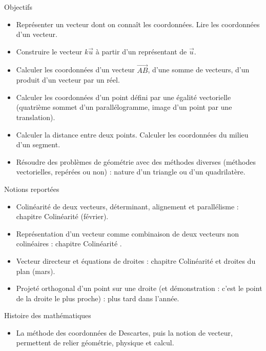 \documentclass{article}
\theoremstyle{definition}
\begin{document}
\begin{paragraph}{Objectifs}
  \begin{itemize}
    \item Représenter un vecteur dont on connaît les coordonnées. Lire les coordonnées d'un vecteur.
    \item Construire le vecteur $k\vec{u}$ à partir d'un représentant de $\vec{u}$.
    \item Calculer les coordonnées d'un vecteur $\overrightarrow{AB}$, d'une somme de vecteurs, d'un produit d'un vecteur par un réel.
    \item Calculer les coordonnées d'un point défini par une égalité vectorielle (quatrième sommet d'un parallélogramme, image d'un point par une translation).
    \item Calculer la distance entre deux points. Calculer les coordonnées du milieu d'un segment.
    \item Résoudre des problèmes de géométrie avec des méthodes diverses (méthodes vectorielles, repérées ou non) : nature d'un triangle ou d'un quadrilatère.
  \end{itemize}
\end{paragraph}

\begin{paragraph}{Notions reportées}
    \begin{itemize}
        \item Colinéarité de deux vecteurs, déterminant, alignement et parallélisme : chapitre \og Colinéarité \fg{} (février).
        \item Représentation d'un vecteur comme combinaison de deux vecteurs non colinéaires : chapitre \og Colinéarité \fg{}.
        \item Vecteur directeur et équations de droites : chapitre \og Colinéarité et droites du plan \fg{} (mars).
        \item Projeté orthogonal d'un point sur une droite (et démonstration : c'est le point de la droite le plus proche) : plus tard dans l'année.
    \end{itemize}
\end{paragraph}

\begin{paragraph}{Histoire des mathématiques}
    \begin{itemize}
        \item La \og méthode des coordonnées \fg{} de Descartes, puis la notion de vecteur, permettent de relier géométrie, physique et calcul.
    \end{itemize}
\end{paragraph}
\end{document}
